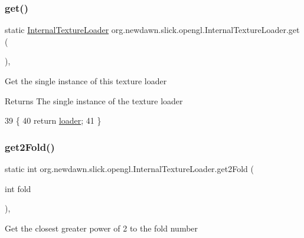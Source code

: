 \subsubsection{\texorpdfstring{get()}{get()}}
{\footnotesize\ttfamily static \mbox{\hyperlink{classorg_1_1newdawn_1_1slick_1_1opengl_1_1_internal_texture_loader}{Internal\+Texture\+Loader}} org.\+newdawn.\+slick.\+opengl.\+Internal\+Texture\+Loader.\+get (\begin{DoxyParamCaption}{ }\end{DoxyParamCaption})\hspace{0.3cm}{\ttfamily [inline]}, {\ttfamily [static]}}

Get the single instance of this texture loader

\begin{DoxyReturn}{Returns}
The single instance of the texture loader 
\end{DoxyReturn}

\begin{DoxyCode}
39                                               \{
40         \textcolor{keywordflow}{return} \mbox{\hyperlink{classorg_1_1newdawn_1_1slick_1_1opengl_1_1_internal_texture_loader_aebc26e4ad3aef900e65a4f21436de165}{loader}};
41     \}
\end{DoxyCode}
\mbox{\label{classorg_1_1newdawn_1_1slick_1_1opengl_1_1_internal_texture_loader_ae9aa071a4fa98cbc080f7d0ad9423ae1}} 
\subsubsection{\texorpdfstring{get2\+Fold()}{get2Fold()}}
{\footnotesize\ttfamily static int org.\+newdawn.\+slick.\+opengl.\+Internal\+Texture\+Loader.\+get2\+Fold (\begin{DoxyParamCaption}\item[{int}]{fold }\end{DoxyParamCaption})\hspace{0.3cm}{\ttfamily [inline]}, {\ttfamily [static]}}

Get the closest greater power of 2 to the fold number


